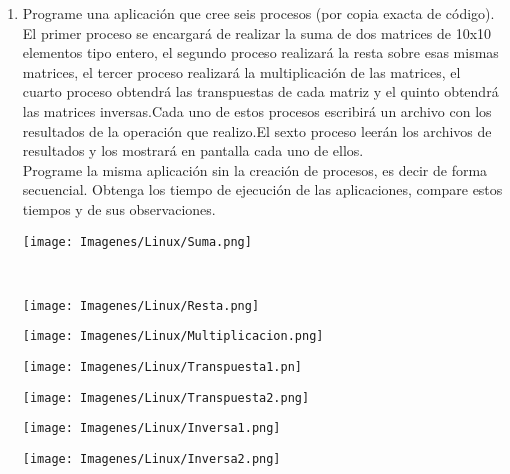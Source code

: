 \documentclass[12pt]{article}
\begin{document}
\begin{enumerate}
        \item Programe una aplicación que cree seis procesos (por copia exacta de código). El primer proceso se encargará de realizar la suma de dos matrices de 10x10 elementos tipo entero, el segundo proceso realizará la resta sobre esas mismas matrices, el tercer proceso realizará la multiplicación de las matrices, el cuarto proceso obtendrá las transpuestas de cada matriz y el quinto obtendrá las matrices inversas.Cada uno de estos procesos escribirá un archivo con los resultados de la operación que realizo.El sexto proceso leerán los archivos de resultados y los mostrará en pantalla cada uno de ellos.\\
        Programe la misma aplicación sin la creación de procesos, es decir de forma secuencial. Obtenga los tiempo de ejecución de las aplicaciones, compare estos tiempos y de sus observaciones.
        \begin{center}
                 \texttt{[image: Imagenes/Linux/Suma.png]}\\
                \end{center}
                 \\
                \begin{center}
                     \texttt{[image: Imagenes/Linux/Resta.png]}\\
                \end{center}
                \begin{center}
                      \texttt{[image: Imagenes/Linux/Multiplicacion.png]}\\
                \end{center}
                \begin{center}
                    \texttt{[image: Imagenes/Linux/Transpuesta1.pn]}
                \end{center}
                \begin{center}
                    \texttt{[image: Imagenes/Linux/Transpuesta2.png]}
                \end{center}  
                \begin{center}
                    \texttt{[image: Imagenes/Linux/Inversa1.png]}\\
                \end{center}
                
                 \begin{center}
                      \texttt{[image: Imagenes/Linux/Inversa2.png]}
                 \end{center}
                  

\end{enumerate}
\end{document}
